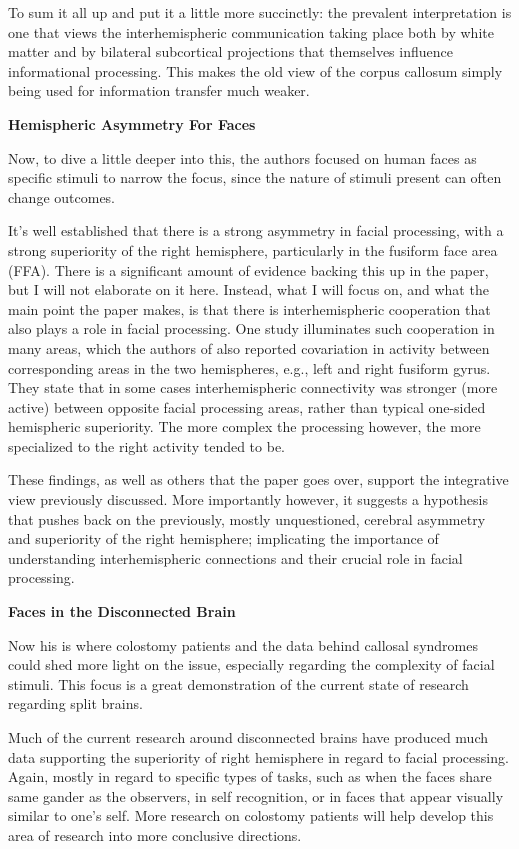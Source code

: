 \documentclass[basic]{inVerba-notes}
\begin{document}
To sum it all up and put it a little more succinctly: the prevalent interpretation is one that views the interhemispheric communication taking place both by white matter and by bilateral subcortical projections that themselves influence informational processing. This makes the old view of the corpus callosum simply being used for information transfer much weaker.

\textbf{Hemispheric Asymmetry For Faces}

Now, to dive a little deeper into this, the authors focused on human faces as specific stimuli to narrow the focus, since the nature of stimuli present can often change outcomes.

It's well established that there is a strong asymmetry in facial processing, with a strong superiority of the right hemisphere, particularly in the fusiform face area (FFA). There is a significant amount of evidence backing this up in the paper, but I will not elaborate on it here. Instead, what I will focus on, and what the main point the paper makes, is that there is interhemispheric cooperation that also plays a role in facial processing. One study illuminates such cooperation in many areas, which the authors of also reported covariation in activity between corresponding areas in the two hemispheres, e.g., left and right fusiform gyrus. They state that in some cases interhemispheric connectivity was stronger (more active) between opposite facial processing areas, rather than typical one-sided hemispheric superiority. The more complex the processing however, the more specialized to the right activity tended to be. 

These findings, as well as others that the paper goes over, support the integrative view previously discussed. More importantly however, it suggests a hypothesis that pushes back on the previously, mostly unquestioned, cerebral asymmetry and superiority of the right hemisphere; implicating the importance of understanding interhemispheric connections and their crucial role in facial processing.

\textbf{Faces in the Disconnected Brain}

Now his is where colostomy patients and the data behind callosal syndromes could shed more light on the issue, especially regarding the complexity of facial stimuli. This focus is a great demonstration of the current state of research regarding split brains. 

Much of the current research around disconnected brains have produced much data supporting the superiority of right hemisphere in regard to facial processing. Again, mostly in regard to specific types of tasks, such as when the faces share same gander as the observers, in self recognition, or in faces that appear visually similar to one's self. More research on colostomy patients will help develop this area of research into more conclusive directions. 
\end{document}
